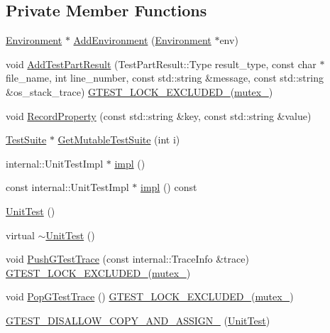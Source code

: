\subsection*{Private Member Functions}
\begin{DoxyCompactItemize}
\item 
\hyperlink{classtesting_1_1Environment}{Environment} $\ast$ \hyperlink{classtesting_1_1UnitTest_a3b64e1255cbd346e0ce40cd3e7a514f7}{Add\+Environment} (\hyperlink{classtesting_1_1Environment}{Environment} $\ast$env)
\item 
void \hyperlink{classtesting_1_1UnitTest_a1d157d2e9a5c1d3405333410c6b13932}{Add\+Test\+Part\+Result} (Test\+Part\+Result\+::\+Type result\+\_\+type, const char $\ast$file\+\_\+name, int line\+\_\+number, const std\+::string \&message, const std\+::string \&os\+\_\+stack\+\_\+trace) \hyperlink{gtest-port_8h_a69abff5a4efdd07bd5faebe3dd318d06}{G\+T\+E\+S\+T\+\_\+\+L\+O\+C\+K\+\_\+\+E\+X\+C\+L\+U\+D\+E\+D\+\_\+}(\hyperlink{classtesting_1_1UnitTest_abb94ef45cf0ab43be81ac6d5b1364132}{mutex\+\_\+})
\item 
void \hyperlink{classtesting_1_1UnitTest_a2c96a4a02c34095e07c6999e7686367f}{Record\+Property} (const std\+::string \&key, const std\+::string \&value)
\item 
\hyperlink{classtesting_1_1TestSuite}{Test\+Suite} $\ast$ \hyperlink{classtesting_1_1UnitTest_a3031406e588a7ac018b106dd995fdf91}{Get\+Mutable\+Test\+Suite} (int i)
\item 
internal\+::\+Unit\+Test\+Impl $\ast$ \hyperlink{classtesting_1_1UnitTest_a4df5d11a58affb337d7fa62eaa07690e}{impl} ()
\item 
const internal\+::\+Unit\+Test\+Impl $\ast$ \hyperlink{classtesting_1_1UnitTest_a266a9f49070d1959c1c9d649423879b4}{impl} () const
\item 
\hyperlink{classtesting_1_1UnitTest_a5e646d37f980429c310af696c8775f5c}{Unit\+Test} ()
\item 
virtual \hyperlink{classtesting_1_1UnitTest_a6bbd0cfbacdf8e438f4e422916683c57}{$\sim$\+Unit\+Test} ()
\item 
void \hyperlink{classtesting_1_1UnitTest_af455b953108ff09b3b6e41011653e78a}{Push\+G\+Test\+Trace} (const internal\+::\+Trace\+Info \&trace) \hyperlink{gtest-port_8h_a69abff5a4efdd07bd5faebe3dd318d06}{G\+T\+E\+S\+T\+\_\+\+L\+O\+C\+K\+\_\+\+E\+X\+C\+L\+U\+D\+E\+D\+\_\+}(\hyperlink{classtesting_1_1UnitTest_abb94ef45cf0ab43be81ac6d5b1364132}{mutex\+\_\+})
\item 
void \hyperlink{classtesting_1_1UnitTest_a70b3e3282778bc9a36520fe0a8be3c57}{Pop\+G\+Test\+Trace} () \hyperlink{gtest-port_8h_a69abff5a4efdd07bd5faebe3dd318d06}{G\+T\+E\+S\+T\+\_\+\+L\+O\+C\+K\+\_\+\+E\+X\+C\+L\+U\+D\+E\+D\+\_\+}(\hyperlink{classtesting_1_1UnitTest_abb94ef45cf0ab43be81ac6d5b1364132}{mutex\+\_\+})
\item 
\hyperlink{classtesting_1_1UnitTest_a1e04cfb4f837cea288a98f2a64c43bba}{G\+T\+E\+S\+T\+\_\+\+D\+I\+S\+A\+L\+L\+O\+W\+\_\+\+C\+O\+P\+Y\+\_\+\+A\+N\+D\+\_\+\+A\+S\+S\+I\+G\+N\+\_\+} (\hyperlink{classtesting_1_1UnitTest}{Unit\+Test})
\end{DoxyCompactItemize}

